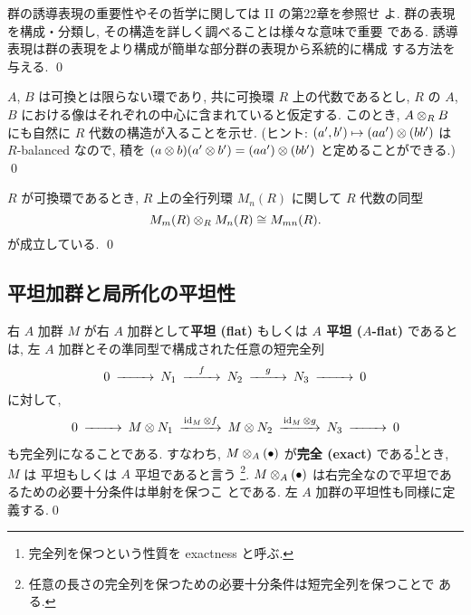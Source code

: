 \documentclass[12pt,twoside]{jarticle}
\begin{document}
\begin{guide}
  群の誘導表現の重要性やその哲学に関しては \cite{hirai} II の第22章を参照せ
  よ.  群の表現を構成・分類し, その構造を詳しく調べることは様々な意味で重要
  である.  誘導表現は群の表現をより構成が簡単な部分群の表現から系統的に構成
  する方法を与える.  \qed
\end{guide}

\begin{question}[代数のテンソル積]
  $A$, $B$ は可換とは限らない環であり, 共に可換環 $R$ 上の代数であるとし,
  $R$ の $A$, $B$ における像はそれぞれの中心に含まれていると仮定する.
  このとき, $A\otimes_R B$ にも自然に $R$ 代数の構造が入ることを示せ. 
  (ヒント: $(a',b')\mapsto (aa')\otimes(bb')$ は $R$-balanced なので, 
  積を $(a\otimes b)(a'\otimes b')=(aa')\otimes(bb')$ と定めることができる.) \qed
\end{question}

\begin{question}
  $R$ が可換環であるとき, $R$ 上の全行列環 $M_n(R)$ に関して $R$ 代数の同型
  \begin{equation*}
    M_m(R)\otimes_R M_n(R) \cong M_{mn}(R).
  \end{equation*}
  が成立している. \qed
\end{question}


\subsection{平坦加群と局所化の平坦性}
\label{sec:flatness}

\begin{definition}[平坦性]
  右 $A$ 加群 $M$ が右 $A$ 加群として{\bf 平坦 (flat)} 
  もしくは {\bf $A$ 平坦 ($A$-flat)} であるとは, 
  左 $A$ 加群とその準同型で構成された任意の短完全列 
  \begin{equation*}
    \begin{CD}
      0 @>>> N_1 @>{f}>> N_2 @>{g}>> N_3 @>>> 0
    \end{CD}
  \end{equation*}
  に対して, 
  \begin{equation*}
    \begin{CD}
      0 @>>> M\o N_1 @>{\id_M\o f}>> M\o N_2 @>{\id_M\o g}>> N_3 @>>> 0
    \end{CD}
  \end{equation*}
  も完全列になることである. すなわち, $M\otimes_A(\bullet)$ が{\bf 完全 (exact)} 
  である\footnote{完全列を保つという性質を exactness と呼ぶ.}とき, $M$ は
  平坦もしくは $A$ 平坦であると言う%
  \footnote{任意の長さの完全列を保つための必要十分条件は短完全列を保つことで
    ある.}. 
  $M\otimes_A(\bullet)$ は右完全なので平坦であるための必要十分条件は単射を保つこ
  とである.
  左 $A$ 加群の平坦性も同様に定義する.\qed
\end{definition}
\end{document}
